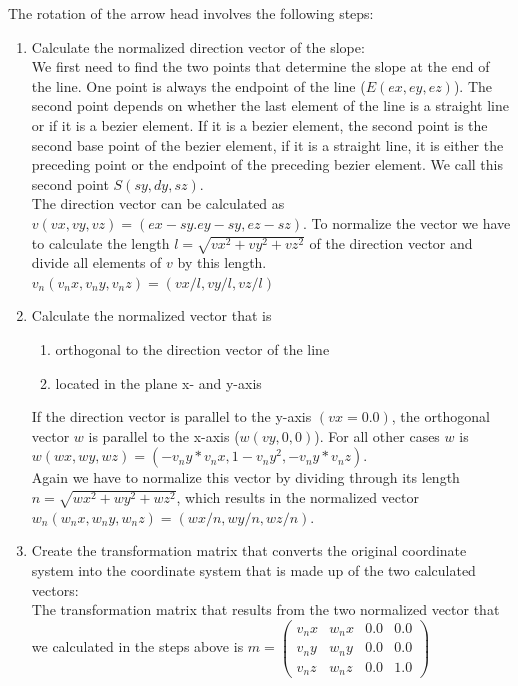 The rotation of the arrow head involves the following steps:

\begin{enumerate}
\item{Calculate the normalized direction vector of the slope:\\
We first need to find the two points that determine the slope at the end of the line. One point is always the endpoint of 
the line ($E(ex,ey,ez)$). The second point depends on whether the last element of the line is a straight line or if it is
a bezier element. If it is a bezier element, the second point is the second base point of the bezier element, if it is a 
straight line, it is either the preceding point or the endpoint of the preceding bezier element. We call this second
point $S(sy,dy,sz)$.\\ The direction vector can be calculated as $v(vx,vy,vz)=(ex-sy.ey-sy,ez-sz)$. To normalize the vector
we have to calculate the length $l=\sqrt{vx^2+vy^2+vz^2}$ of the direction vector and divide all elements of $v$ by this
length. $v_n(v_{n}x,v_{n}y,v_{n}z)=(vx/l,vy/l,vz/l)$}

\item{Calculate the normalized vector that is
\begin{enumerate}
\item{orthogonal to the direction vector of the line}
\item{located in the plane x- and y-axis}
\end{enumerate}
If the direction vector is parallel to the y-axis $(vx=0.0)$, the orthogonal vector $w$ is parallel to the x-axis ($w(vy,0,0)$).
For all other cases $w$ is $w(wx,wy,wz)=(-v_{n}y*v_{n}x,1-v_{n}y^2,-v_{n}y*v_{n}z)$.\\ Again we have to normalize this
vector by dividing through its length $n=\sqrt{wx^2+wy^2+wz^2}$, which results in the normalized vector\\
$w_n(w_{n}x,w_{n}y,w_{n}z)=(wx/n,wy/n,wz/n)$.
}
\item{Create the transformation matrix that converts the original coordinate system into the coordinate system
that is made up of the two calculated vectors:\\
\vspace*{0.3cm}
The transformation matrix that results from the two normalized vector that we calculated in the steps above
is $m=\left(\begin{array}{cccc} v_{n}x & w_{n}x & 0.0 & 0.0\\ v_{n}y & w_{n}y & 0.0 & 0.0\\ v_{n}z & w_{n}z & 0.0 & 1.0 \end{array}\right)$}
\end{enumerate}


